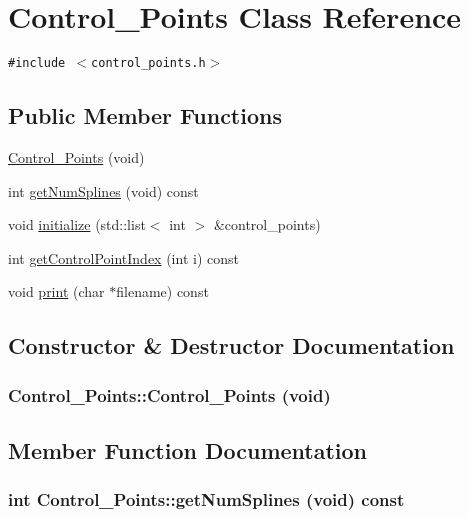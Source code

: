 \hypertarget{classControl__Points}{
\section{Control\_\-Points Class Reference}
\label{classControl__Points}
}
{\tt \#include $<$control\_\-points.h$>$}

\subsection*{Public Member Functions}
\begin{CompactItemize}
\item 
\hyperlink{classControl__Points_8363bdea513afaf8ad08a1da145b6375}{Control\_\-Points} (void)
\item 
int \hyperlink{classControl__Points_a151267c6a3d7749ca6091a0ed9a5210}{getNumSplines} (void) const 
\item 
void \hyperlink{classControl__Points_7d33201ade6e5fb8052a2aa481a640ba}{initialize} (std::list$<$ int $>$ \&control\_\-points)
\item 
int \hyperlink{classControl__Points_e5ba1b63a5096969cae1ad01c0ee5b38}{getControlPointIndex} (int i) const 
\item 
void \hyperlink{classControl__Points_7970a63575538777628a42a3847b7af3}{print} (char $\ast$filename) const 
\end{CompactItemize}


\subsection{Constructor \& Destructor Documentation}
\hypertarget{classControl__Points_8363bdea513afaf8ad08a1da145b6375}{
\subsubsection[Control\_\-Points]{\setlength{\rightskip}{0pt plus 5cm}Control\_\-Points::Control\_\-Points (void)}}
\label{classControl__Points_8363bdea513afaf8ad08a1da145b6375}




\subsection{Member Function Documentation}
\hypertarget{classControl__Points_a151267c6a3d7749ca6091a0ed9a5210}{
\subsubsection[getNumSplines]{\setlength{\rightskip}{0pt plus 5cm}int Control\_\-Points::getNumSplines (void) const}}
\label{classControl__Points_a151267c6a3d7749ca6091a0ed9a5210}


